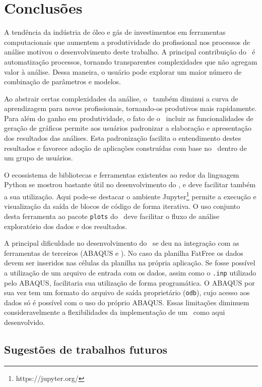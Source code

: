 \chapter{Conclusões}\label{chap:conclusao}


A tendência da indústria de óleo e gás de investimentos em ferramentas computacionais que aumentem a produtividade do profissional nos processos de análise motivou o desenvolvimento deste trabalho. A principal contribuição do \frame\ é automatização processos, tornando transparentes complexidades que não agregam valor à análise. Dessa maneira, o usuário pode explorar um maior número de combinação de parâmetros e modelos.

Ao abstrair certas complexidades da análise, o \frame\ também diminui a curva de aprendizagem para novos profissionais, tornando-os produtivos mais rapidamente.
Para além do ganho em produtividade, o fato de o \frame\ incluir as funcionalidades de geração de gráficos permite aos usuários padronizar a elaboração e apresentação dos resultados das análises. Esta padronização facilita o entendimento destes resultados e favorece adoção de aplicações construídas com base no \frame\ dentro de um grupo de usuários.

O ecossistema de bibliotecas e ferramentas existentes ao redor da linguagem Python se mostrou bastante útil no desenvolvimento do \frame, e deve facilitar também a sua utilização. Aqui pode-se destacar o ambiente Jupyter\footnote{https://jupyter.org/} permite a execução e visualização da saída de blocos de código de forma iterativa. O uso conjunto desta ferramenta ao pacote \texttt{plots} do \frame\ deve facilitar o fluxo de análise exploratório dos dados e dos resultados.

A principal dificuldade no desenvolvimento do \frame\ se deu na integração com as ferramentas de terceiros (ABAQUS e \fatfree). No caso da planilha FatFree os dados devem ser inseridos nas células da planilha na própria aplicação. Se fosse possível a utilização de um arquivo de entrada com os dados, assim como o \texttt{.inp} utilizado pelo ABAQUS, facilitaria sua utilização de forma programática. O ABAQUS por sua vez tem um formato do arquivo de saída proprietário (\texttt{odb}), cujo acesso aos dados só é possível com o uso do próprio ABAQUS. Essas limitações diminuem consideravelmente a flexibilidades da implementação de um \frame\ como aqui desenvolvido.


\section{Sugestões de trabalhos futuros}


